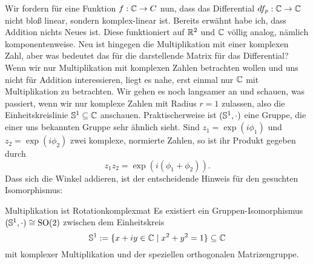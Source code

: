 Wir fordern für eine Funktion $f: \C \to C$ nun, dass das Differential $df_p: \C \to \C$ nicht bloß linear, sondern komplex-linear ist. Bereits erwähnt habe ich, dass Addition nichts Neues ist. Diese funktioniert auf $\R^2$ und $\C$ völlig analog, nämlich komponentenweise. Neu ist hingegen die Multiplikation mit einer komplexen Zahl, aber was bedeutet das für die darstellende Matrix für das Differential? Wenn wir nur Multiplikation mit komplexen Zahlen betrachten wollen und uns nicht für Addition interessieren, liegt es nahe, erst einmal nur $\C$ mit Multiplikation zu betrachten. Wir gehen es noch langsamer an und schauen, was passiert, wenn wir nur komplexe Zahlen mit Radius $r=1$ zulassen, also die Einheitskreislinie $\S^1 \sub \C$ anschauen. Praktischerweise ist $(\S^1, \cdot)$ eine Gruppe, die einer uns bekannten Gruppe sehr ähnlich sieht. Sind $z_1 = \exp(i\phi_1)$ und $z_2 = \exp(i \phi_2)$ zwei komplexe, normierte Zahlen, so ist ihr Produkt gegeben durch
\begin{equation}
z_1z_2 = \exp(i(\phi_1+\phi_2)).
\end{equation}
Dass sich die Winkel addieren, ist der entscheidende Hinweis für den gesuchten Isomorphismus:
\begin{satz}{Multiplikation ist Rotation}{komplexmat}
Es existiert ein Gruppen-Isomorphismus $(\S^1, \cdot) \cong \so{2}$ zwischen dem Einheitskreis
\begin{equation}
\S^1 := \{x+iy \in \C \mid x^2+y^2=1\} \sub \C
\end{equation}
mit komplexer Multiplikation und der speziellen orthogonalen Matrizengruppe.
\end{satz}
